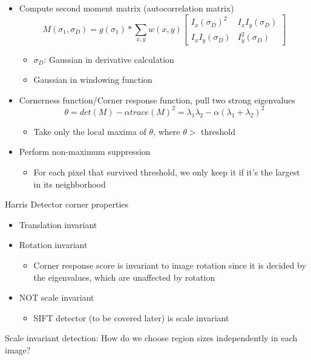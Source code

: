 \begin{itemize}
    \item Compute second moment matrix (autocorrelation matrix)
    \[M(\sigma_1, \sigma_D)= g(\sigma_1)*\sum_{x,y}w(x,y)\begin{bmatrix}
    I_x(\sigma_D)^2&I_xI_y(\sigma_D)\\I_xI_y(\sigma_D)&I_y^2(\sigma_D)
    \end{bmatrix}\]
    \begin{itemize}
        \item $\sigma_D$: Gaussian in derivative calculation
        \item Gaussian in windowing function
    \end{itemize}
    \item Cornerness function/Corner response function, pull two strong eigenvalues
    \[\theta=det(M)-\alpha trace(M)^2=\lambda_1\lambda_2-\alpha(\lambda_1+\lambda_2)^2\]
    \begin{itemize}
        \item Take only the local maxima of $\theta$, where $\theta > $ threshold
    \end{itemize}
    \item Perform non-maximum suppression
    \begin{itemize}
        \item For each pixel that survived threshold, we only keep it if it's the largest in its neighborhood
    \end{itemize}
\end{itemize}
Harris Detector corner properties
\begin{itemize}
    \item Translation invariant
    \item Rotation invariant
    \begin{itemize}
        \item Corner response score is invariant to image rotation since it is decided by the eigenvalues, which are unaffected by rotation
    \end{itemize}
    \item NOT scale invariant
    \begin{itemize}
        \item SIFT detector (to be covered later) is scale invariant
    \end{itemize}
\end{itemize}
Scale invariant detection: How do we choose region sizes independently in each image?
